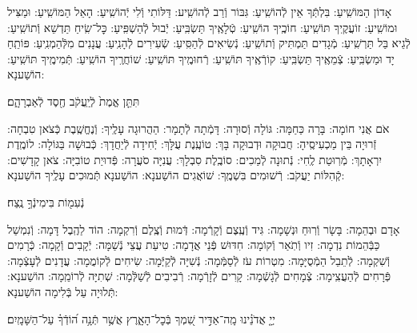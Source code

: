 \documentclass[twoside, openany, parskip=half, 11pt]{book}
\begin{document}
\begin{sometimes}

אָדוֹן הַמּוֹשִֽׁיעַ: בִּלְתְּֿךָ אֵין לְֿהוֹשִֽׁיעַ: גִּבּוֹר וְֿרַב לְֿהוֹשִֽׁיע: דַּלּוֹתִי וְֿלִי יְֿהוֹשִֽׁיעַ: הָאֵל הַמּוֹשִֽׁיעַ: וּמַצִּיל וּמוֹשִֽׁיעַ: זוֹעֲקֶֽיךָ תּוֹשִֽׁיעַ: חוֹכֶֽיךָ הוֹשִֽׁיעַ: טְֿלָאֶֽיךָ תַּשְׂבִּֽיעַ: יְֿבוּל לְֿהַשְׁפִּֽיעַ: כׇּל־שִֽׂיחַ תַּדְשֵׁא וְֿתוֹשִֽׁיעַ: לְֿגֵיא בַּל תַּרְשִֽׁיעַ: מְֿגָדִים תַּמְתִּיק וְֿתוֹשִֽׁיעַ: נְֿשִׂיאִים לְֿהַסִּֽיעַ: שְֿׂעִירִים לְֿהָנִֽיעַ: עֲנָנִים מִלְּֿהַמְנִֽיעַ: פּוֹתֵֽחַ יָד וּמַשְׂבִּֽיעַ: צְֿמֵאֶֽיךָ תַּשְׂבִּֽיעַ: קוֹרְֿאֶֽיךָ תּוֹשִֽׁיעַ: רְֿחוּמֶֽיךָ תּוֹשִֽׁיעַ:
שׁוֹחֲרֶֽיךָ הוֹשִֽׁיעַ:
תְּֿמִימֶֽיךָ תּוֹשִֽׁיעַ: הוֹשַׁענָא:

 תִּתֵּ֤ן אֱמֶת֙ לְֿיַֽעֲקֹ֔ב חֶ֖סֶד לְֿאַבְרָהָ֑ם׃


אֹם אֲנִי חוֹמָה: בָּרָה כַּחַמָּה: גּוֹלָה וְֿסוּרָה: דָּמְֿתָה לְֿתָמָר: הַהֲרוּגָה עָלֶֽיךָ: וְֿנֶחֱשֶֽׁבֶת כְּֿצֹאן טִבְחָה: זְֿרוּיָה בֵּין מַכְעִיסֶֽיהָ: חֲבוּקָה וּדְבוּקָה בָּךְ: טוֹעֶֽנֶת עֻלָּךְ: יְֿחִידָה לְֿיַחֲדָךְ: כְּֿבוּשָׁה בַּגּוֹלָה: לוֹמֶֽדֶת יִרְאָתָךְ: מְֿרֽוּטַת לֶֽחִי: נְֿתוּנָה לְֿמַכִים: סוֹבֶֽלֶת סִבְלָךְ: עֲנִיָּה סֹעֲרָה: פְּֿדוּיַת טוֹבִיָּה: צֹאן קָדָשִׁים: קְֿהִלּוֹת יַעֲקֹב: רְֿשׁוּמִים בִּשְׁמֶֽךָ: שׁוֹאֲגִים הוֹשַׁענָא: הוֹשַׁענָא תְּֿמוּכִים עָלֶֽיךָ הוֹשַׁענָא:

 נְֿעִמ֖וֹת בִּימִינְֿךָ֣ נֶֽצַח׃


אָדָם וּבְהֵמָה: בָּשָׂר וְֿרֽוּחַ וּנְשָׁמָה: גִּיד וְֿעֶֽצֶם וְֿקָרְֿמָה: דְּֿמוּת וְֿצֶֽלֶם וְֿרִקְמָה: הוֹד לַהֶֽבֶל דָּמָה: וְֿנִמְשַׁל כַּבְּֿהֵמוֹת נִדְמָה: זִיו וְֿתֹֽאַר וְֿקוֹמָה: חִדּוּשׁ פְּֿנֵי אֲדָמָה: טִיעַת עֲצֵי נְֿשַׁמָּה: יְֿקָבִים וְֿקָמָה: כְּֿרָמִים וְֿשִׁקְמָה: לְֿתֵבֵל הַמְֿסֻיָּמָה: מִטְרוֹת עֹז לְֿסַמְּֿמָה: נְֿשִׁיָּה לְֿקַיְּֿמָה: שִׂיחִים לְֿקוֹמֲמָה: עֲדָנִים לְֿעָצְֿמָה: פְּֿרָחִים לְֿהַעֲצִֽימָה: צְֿמָחִים לְֿגָשְֿׁמָה: קָרִים לְֿזָרְֿמָה: רְֿבִיבִים לְֿשַׁלְּֿמָה:
שְׁתִיָּה לְֿרוֹמֵֽמָה: הוֹשַׁענָא:
תְּֿלוּיָה עַל בְּֿלִימָה הוֹשַׁענָא:

 יְיָ֤ אֲדֹנֵ֗ינוּ מָֽה־אַדִּ֣יר שִׁ֭מְךָ בְּֿכׇל־הָאָ֑רֶץ אֲשֶׁ֥ר תְּֿנָ֥ה ה֝וֹדְֿךָ֗ עַל־הַשָּׁמָֽיִם׃



\end{sometimes}
\end{document}
